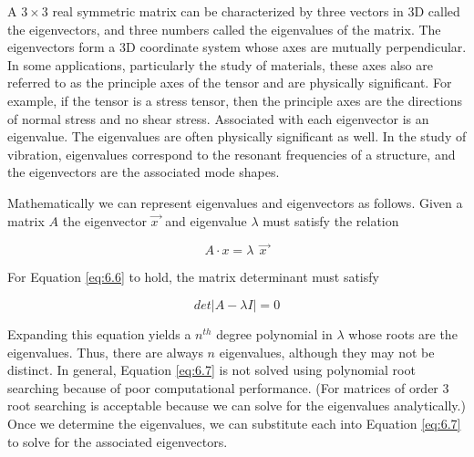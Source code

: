 A $3 \times 3$ real symmetric matrix can be characterized by three vectors in 3D called the eigenvectors, and three numbers called the eigenvalues of the matrix. The eigenvectors form a 3D coordinate system whose axes are mutually perpendicular. In some applications, particularly the study of materials, these axes also are referred to as the principle axes of the tensor and are physically significant. For example, if the tensor is a stress tensor, then the principle axes are the directions of normal stress and no shear stress. Associated with each eigenvector is an eigenvalue. The eigenvalues are often physically significant as well. In the study of vibration, eigenvalues correspond to the resonant frequencies of a structure, and the eigenvectors are the associated mode shapes.

Mathematically we can represent eigenvalues and eigenvectors as follows. Given a matrix $A$ the eigenvector $\overrightarrow{x\ }$ and eigenvalue $\lambda$ must satisfy the relation 

\begin{equation}\label{eq:6.6}
A \cdot x = \lambda\ \  \overrightarrow{x\ }
\end{equation}

\noindent For Equation \ref{eq:6.6} to hold, the matrix determinant must satisfy

\begin{equation}\label{eq:6.7}
det |A-\lambda I| = 0
\end{equation}

\noindent Expanding this equation yields a $n^{th}$ degree polynomial in $\lambda$ whose roots are the eigenvalues. Thus, there are always $n$ eigenvalues, although they may not be distinct. In general, Equation \ref{eq:6.7} is not solved using polynomial root searching because of poor computational performance. (For matrices of order 3 root searching is acceptable because we can solve for the eigenvalues analytically.) Once we determine the eigenvalues, we can substitute each into Equation \ref{eq:6.7} to solve for the associated eigenvectors.


